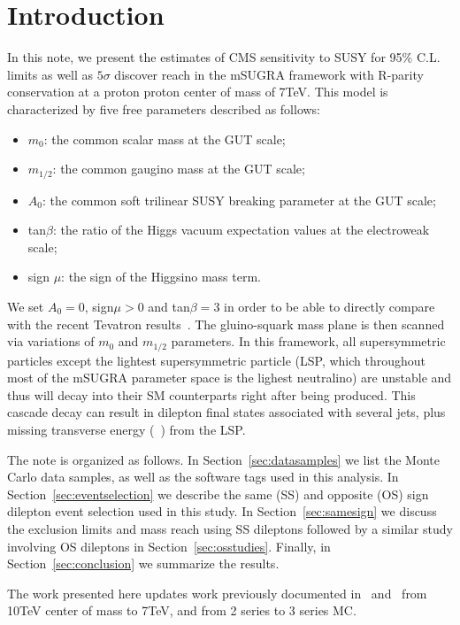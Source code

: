 \section{Introduction}
\label{sec:intro}

In this note, we present the estimates of CMS sensitivity to SUSY for
95\% C.L. limits as well as $5\sigma$ discover reach 
in the mSUGRA framework with R-parity conservation at a proton proton
center of mass of 7TeV. This model is characterized by five 
free parameters described as follows: 

\begin{itemize}
\item $m_{0}$: the common scalar mass at the GUT scale; 
\item $m_{1/2}$: the common gaugino mass at the GUT scale; 
\item $A_{0}$: the common soft trilinear SUSY breaking parameter at
  the GUT scale; 
\item tan$\beta$: the ratio of the Higgs vacuum expectation values at
  the electroweak scale; 
\item sign $\mu$: the sign of the Higgsino mass term. 
\end{itemize}

We set $A_{0} = 0$, sign$\mu > 0$ and tan$\beta = 3$ in order to be
able to directly compare with the recent Tevatron
results~\cite{cdf:recentSusy,d0:recentSusy}. The gluino-squark
mass plane is then scanned  via variations of $m_{0}$ and $m_{1/2}$
parameters. In this framework, all supersymmetric particles except the
lightest supersymmetric particle (LSP, which throughout most of the
mSUGRA parameter space is the lighest neutralino) are unstable and
thus will decay into their SM counterparts right after being
produced. This cascade decay can result in dilepton final states
associated  with several jets, plus missing transverse energy (\met~)
from the LSP.  

The note is organized as follows. In Section~\ref{sec:datasamples} we
list the Monte Carlo data samples, as well as the  software tags used
in this analysis. In Section~\ref{sec:eventselection} we describe the
same (SS) and opposite (OS) sign  dilepton event selection used in
this study. 
In Section~\ref{sec:samesign} we discuss the exclusion limits and mass
reach using SS dileptons followed by a similar study involving OS
dileptons in Section~\ref{sec:osstudies}. Finally, in
Section~\ref{sec:conclusion} we summarize the results.  

The work presented here updates work previously documented
in~\cite{osnote} and~\cite{ssnote} from 10TeV center of mass to 7TeV, 
and from 2 series to 3 series MC.
 
 



